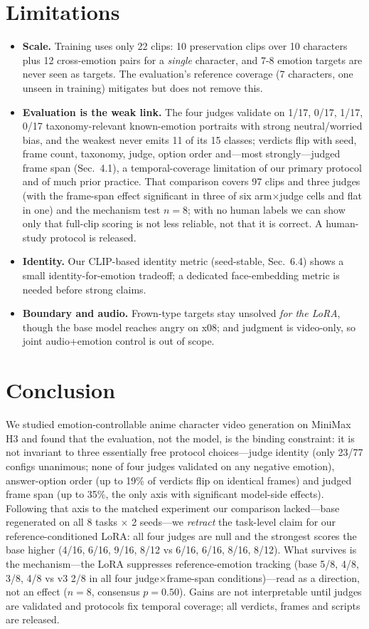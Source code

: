 \documentclass{article}
\begin{document}
\section{Limitations}
\begin{itemize}
\item \textbf{Scale.} Training uses only 22 clips: 10 preservation clips over 10 characters plus 12
cross-emotion pairs for a \emph{single} character, and 7-8 emotion targets are never seen as targets.
The evaluation's reference coverage (7 characters, one unseen in training) mitigates but does not remove
this.
\item \textbf{Evaluation is the weak link.} The four judges validate on 1/17, 0/17, 1/17, 0/17
taxonomy-relevant known-emotion portraits with strong neutral/worried bias, and the weakest never emits
11 of its 15 classes; verdicts flip with seed, frame count, taxonomy, judge, option order and---most
strongly---judged frame span (Sec.~4.1), a temporal-coverage limitation of our primary protocol and of
much prior practice. That comparison covers 97 clips and three judges (with the frame-span effect significant in three of
six arm$\times$judge cells and flat in one) and the mechanism test $n{=}8$; with
no human labels we can show only that full-clip scoring is not less reliable, not that it is correct. A human-study
protocol is released.
\item \textbf{Identity.} Our CLIP-based identity metric (seed-stable, Sec.~6.4) shows a small
identity-for-emotion tradeoff; a dedicated face-embedding metric is needed before strong claims.
\item \textbf{Boundary and audio.} Frown-type targets stay unsolved \emph{for the LoRA}, though the base
model reaches angry on x08; and judgment is video-only, so joint audio+emotion control is out of scope.
\end{itemize}

\section{Conclusion}
We studied emotion-controllable anime character video generation on MiniMax H3 and found that the
evaluation, not the model, is the binding constraint: it is not invariant to three essentially free
protocol choices---judge identity (only 23/77 configs unanimous; none of four judges validated on any
negative emotion), answer-option order (up to 19\% of verdicts flip on identical frames) and judged frame
span (up to 35\%, the only axis with significant model-side effects). Following that
axis to the matched experiment our comparison lacked---base regenerated on all 8 tasks $\times$ 2
seeds---we \emph{retract} the task-level claim for our reference-conditioned LoRA: all four judges are
null and the strongest scores the base higher (4/16, 6/16, 9/16, 8/12 vs 6/16, 6/16, 8/16, 8/12). What survives is the
mechanism---the LoRA suppresses reference-emotion tracking (base 5/8, 4/8, 3/8, 4/8 vs v3 2/8 in all four
judge$\times$frame-span conditions)---read as a direction, not an effect ($n{=}8$, consensus $p{=}0.50$).
Gains are not interpretable until judges are validated and protocols fix temporal coverage; all
verdicts, frames and scripts are released.
\end{document}
